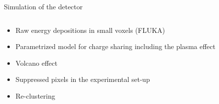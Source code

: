 \documentclass{beamer}
\begin{document}
\begin{frame}{\centering Simulation of the detector}
  \begin{columns}
    \begin{column}{0.45\textwidth}
      \begin{itemize}
      \item<1->{Raw energy depositions in small voxels (FLUKA)}
      \item<2->{Parametrized model for charge sharing including the plasma effect}
      \item<3->{Volcano effect}
      \item<4->{Suppressed pixels in the experimental set-up}
      \item<4->{Re-clustering}
      \end{itemize}
    \end{column}
    \begin{column}{0.55\textwidth}
\end{column}
\end{columns}
\end{frame}
\end{document}

